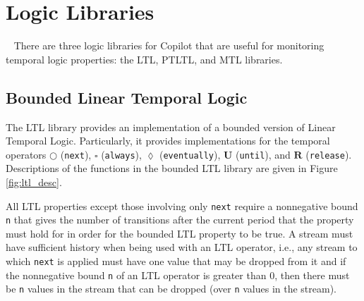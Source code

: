 \newcommand{\previous}{\overset{\leftarrow}{\bigcirc}}
\newcommand{\alwaysBeen}{\overset{\leftarrow}{\square}}
\newcommand{\eventuallyPrev}{\overset{\leftarrow}{\lozenge}}

\section{Logic Libraries}~\label{sec:logic}
There are three logic libraries for Copilot that are useful for
monitoring temporal logic properties: the LTL, PTLTL, and MTL libraries.

\subsection{Bounded Linear Temporal Logic}
The LTL library provides an implementation of a bounded version of Linear
Temporal Logic. Particularly, it provides implementations for the temporal
operators $\bigcirc$ ({\tt next}), $\square$ ({\tt always}),
$\lozenge$ ({\tt eventually}), $\mathbf{U}$ ({\tt until}), and
$\mathbf{R}$ ({\tt release}). Descriptions of the functions in the
bounded LTL library are given in Figure \ref{fig:ltl_desc}.

All LTL properties except those involving only {\tt next}
require a nonnegative bound {\tt n} that gives the number of transitions
after the current period that the property must hold for in order
for the bounded LTL property to be true.
A stream must have sufficient history when being used with
an LTL operator, i.e., any stream to which {\tt next} is applied must
have one value that may be dropped from it and if the nonnegative bound
{\tt n} of an LTL operator is greater than 0, then there must be 
{\tt n} values in the stream that can be dropped (over {\tt n} values
in the stream).

